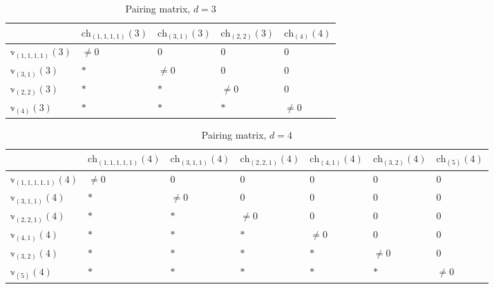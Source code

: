 \documentclass[main.tex]{subfiles}
\begin{document}
\begin{table}[!h]
        \centering
\begin{tabular}{|p{}|p{}|p{}|p{}|p{}|}
\hline 
  & $\displaystyle \mathrm{ch}_{(1,1,1,1)}(3)$ & $\displaystyle \mathrm{ch}_{(3,1)}(3)$ & $\displaystyle\mathrm{ch}_{(2,2)}(3) $ & $\displaystyle \mathrm{ch}_{(4)}(4)$ \\
\hline 
 $\displaystyle \mathbb{v}_{(1,1,1,1)}( 3)$ & $\displaystyle \neq 0$ & $\displaystyle 0$ & $\displaystyle  0$ & $\displaystyle 0$ \\
\hline 
 $\displaystyle \mathbb{v}_{(3,1)}( 3)$ & $\displaystyle *$ & $\displaystyle \neq 0$ & $\displaystyle 0$ & $\displaystyle 0$ \\
\hline 
 $\displaystyle \mathbb{v}_{(2,2)}( 3)$ & $\displaystyle *$ & $\displaystyle *$ & $\displaystyle \neq 0$ & $\displaystyle 0$ \\
\hline 
 $\displaystyle \mathbb{v}_{(4)}( 3)$ & $\displaystyle *$ & $\displaystyle *$ & $\displaystyle *$ & $\displaystyle \neq 0$ \\
 \hline
\end{tabular}
\caption{Pairing matrix, $d=3$}
        \end{table}
        \begin{table}[!h]
        \centering
\begin{tabular}{|p{}|p{}|p{}|p{}|p{}|p{}|p{}|}
\hline 
  & $\displaystyle \mathrm{ch}_{(1,1,1,1,1)}(4)$ & $\displaystyle \mathrm{ch}_{(3,1,1)}(4)$ & $\displaystyle\mathrm{ch}_{(2,2,1)}(4) $ & $\displaystyle \mathrm{ch}_{(4,1)}(4)$ &$\displaystyle \mathrm{ch}_{(3,2)}(4)$& $\displaystyle \mathrm{ch}_{(5)}(4)$ \\
\hline 
 $\displaystyle \mathbb{v}_{(1,1,1,1,1)}( 4)$ & $\displaystyle \neq 0$ & $\displaystyle 0$ & $\displaystyle  0$ & $\displaystyle 0$& $\displaystyle 0$& $\displaystyle 0$ \\
\hline 
 $\displaystyle \mathbb{v}_{(3,1,1)}( 4)$ & $\displaystyle *$ & $\displaystyle \neq 0$ & $\displaystyle 0$ & $\displaystyle 0$ & $\displaystyle 0$& $\displaystyle 0$ \\
\hline 
 $\displaystyle \mathbb{v}_{(2,2,1)}( 4)$ & $\displaystyle *$ & $\displaystyle *$ & $\displaystyle \neq 0$ & $\displaystyle 0$& $\displaystyle 0$& $\displaystyle 0$  \\
\hline 
 $\displaystyle \mathbb{v}_{(4,1)}( 4)$ & $\displaystyle *$ & $\displaystyle *$ & $\displaystyle *$ & $\displaystyle \neq 0$ & $\displaystyle 0$& $\displaystyle 0$ \\
 \hline
 $\displaystyle \mathbb{v}_{(3,2)}( 4)$ & $\displaystyle *$ & $\displaystyle *$ & $\displaystyle *$ & $\displaystyle *$ & $\displaystyle \neq 0$& $\displaystyle 0$ \\
 \hline
  $\displaystyle \mathbb{v}_{(5)}( 4)$ & $\displaystyle *$ & $\displaystyle *$ & $\displaystyle *$ & $\displaystyle *$ & $\displaystyle *$& $\displaystyle \neq 0$ \\
 \hline
\end{tabular}
\caption{Pairing matrix, $d=4$}
\end{table}
\end{document}
